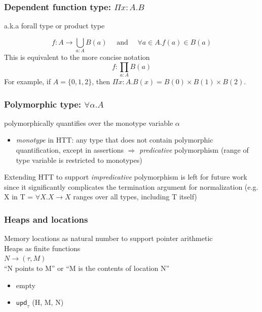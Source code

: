 \documentclass[xcolor=dvipsnames,9pt,hide notes,mathserif]{beamer}
\newcommand{\upd}{\ensuremath{\mathsf{upd}}}
\begin{document}
\begin{frame}
  \frametitle{Dependent function type: $\Pi x{:}A. B$}
  a.k.a forall type or product type

\[
  f: A \rightarrow \bigcup_{a:A} B(a)  \quad\text{ and }\quad \forall a \in A. f(a) \in B(a)
\]
\vskip1cm
This is equivalent to the more concise notation
\[
  f:  \prod_{a{:}A}B(a)
\]
\vskip1cm
For example, if $A = \{0,1,2\}$, then $\Pi x{:}A.B(x) = B(0) \times B(1) \times B(2)$.
\end{frame}



\begin{frame}
  \frametitle{Polymorphic type: $\forall \alpha.A$}
  polymorphically quantifies over the monotype variable $\alpha$
  
  \begin{itemize}
  \item \textit{monotype} in HTT: any type that does not contain polymorphic quantification, except in assertions
    $\Rightarrow$ \textit{predicative} polymorphism (range of type variable is restricted to monotypes)
  \end{itemize}
\vskip1cm
  Extending HTT to support \textit{impredicative} polymorphism is left for future work since it significantly complicates the termination argument for normalization (e.g. X in T = $\forall X. X \rightarrow X$ ranges over all types, including T itself)
  
\end{frame}






\begin{frame}
  \frametitle{Heaps and locations}
  Memory locations as natural number to support pointer arithmetic\\
  Heaps as finite functions\\[6pt]

  $N \longrightarrow (\tau, M)$\\[6pt]

  ``N points to M'' or ``M is the contents of location N''
  
  \begin{itemize}
  \item empty
  \item $\upd_\tau$ (H, M, N)
  \end{itemize}

\end{frame}
\end{document}
